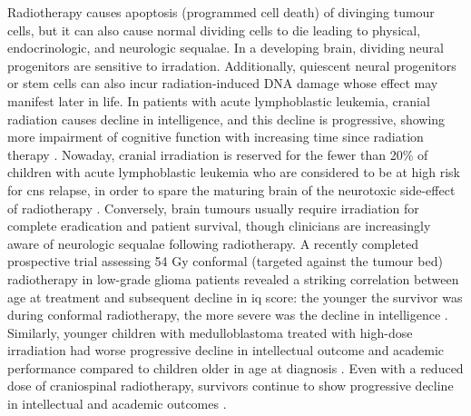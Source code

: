 Radiotherapy causes apoptosis (programmed cell death) of divinging tumour cells, but it can also cause normal dividing cells to die leading to physical, endocrinologic, and neurologic sequalae. In a developing brain, dividing neural progenitors are sensitive to irradation. Additionally, quiescent neural progenitors or stem cells can also incur radiation-induced DNA damage whose effect may manifest later in life. In patients with acute lymphoblastic leukemia, cranial radiation causes decline in intelligence, and this decline is progressive, showing more impairment of cognitive function with increasing time since radiation therapy . Nowaday, cranial irradiation is reserved for the fewer than 20\% of children with acute lymphoblastic leukemia who are considered to be at high risk for \gls{cns} relapse, in order to spare the maturing brain of the neurotoxic side-effect of radiotherapy . Conversely, brain tumours usually require irradiation for complete eradication and patient survival, though clinicians are increasingly aware of neurologic sequalae following radiotherapy. A recently completed prospective trial assessing 54 Gy conformal (targeted against the tumour bed) radiotherapy in low-grade glioma patients revealed a striking correlation between age at treatment and subsequent decline in \gls{iq} score: the younger the survivor was during conformal radiotherapy, the more severe was the decline in intelligence . Similarly, younger children with medulloblastoma treated with high-dose irradiation had worse progressive decline in intellectual outcome and academic performance compared to children older in age at diagnosis . Even with a reduced dose of craniospinal radiotherapy, survivors continue to show progressive decline in intellectual and academic outcomes .

